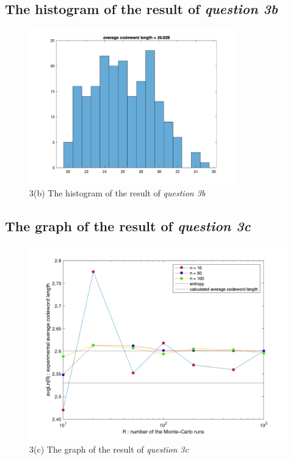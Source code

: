 \documentclass{article}
\begin{document}
\begin{CJK*}{UTF8}{bsmi}
\subsection{The histogram of the result of \emph{question 3b}}
\begin{figure}[h]
\centering
\includegraphics[width=0.8\textwidth]{3b.png}
\caption{\label{fig:3b.png}3(b) The histogram of the result of \emph{question 3b}}
\end{figure}

\subsection{The graph of the result of \emph{question 3c}}
\begin{figure}[h]
\centering
\includegraphics[width=1\textwidth]{3c.png}
\caption{\label{fig:3c.png}3(c) The graph of the result of \emph{question 3c}}
\end{figure}

\end{CJK*}
\end{document}
